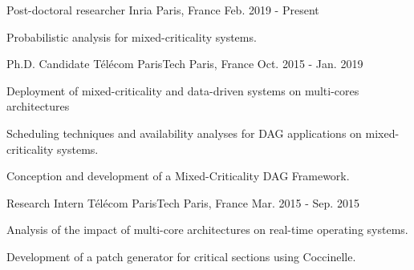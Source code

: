 


\begin{cventries}


\cventry
{Post-doctoral researcher} %
{Inria} %
{Paris, France} %
{Feb. 2019 - Present} %
{ %
\begin{cvitems}
\item {Probabilistic analysis for mixed-criticality systems.}
\end{cvitems}
}


\cventry
{Ph.D. Candidate} %
{Télécom ParisTech} %
{Paris, France} %
{Oct. 2015 - Jan. 2019} %
{ %
\begin{cvitems}
\item {Deployment of mixed-criticality and data-driven systems on multi-cores 
architectures}
\item {Scheduling techniques and availability analyses for DAG applications on 
mixed-criticality systems.}
\item {Conception and development of a Mixed-Criticality DAG Framework.}
\end{cvitems}
}


\cventry
{Research Intern} %
{Télécom ParisTech} %
{Paris, France} %
{Mar. 2015 - Sep. 2015} %
{ %
\begin{cvitems}
\item {Analysis of the impact of multi-core architectures on real-time 
operating systems.}
\item {Development of a patch generator for critical sections using Coccinelle.}
\end{cvitems} 
}


\end{cventries}
